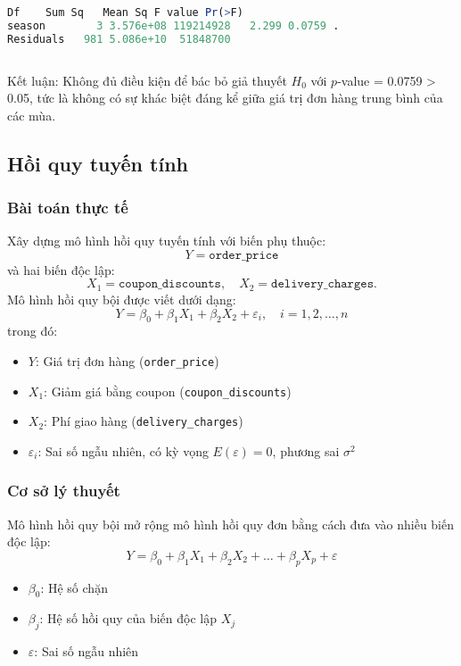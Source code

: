 \begin{lstlisting}[language=R, caption=Kết quả ANOVA một yếu tố]
Df    Sum Sq   Mean Sq F value Pr(>F)  
season        3 3.576e+08 119214928   2.299 0.0759 .
Residuals   981 5.086e+10  51848700 
  
\end{lstlisting}
Kết luận: Không đủ điều kiện để bác bỏ giả thuyết $H_0$ với $p$-value = 0.0759 > 0.05, tức là không có sự khác biệt đáng kể giữa giá trị đơn hàng trung bình của các mùa.
\pagebreak
\subsection{Hồi quy tuyến tính}

\subsubsection{Bài toán thực tế}
Xây dựng mô hình hồi quy tuyến tính với biến phụ thuộc:
\[
Y = \texttt{order\_price}
\]
và hai biến độc lập:
\[
X_1 = \texttt{coupon\_discounts}, \quad X_2 = \texttt{delivery\_charges}.
\]
Mô hình hồi quy bội được viết dưới dạng:
\[
Y = \beta_0 + \beta_1 X_1 + \beta_2 X_2 + \varepsilon_i, \quad i = 1, 2, \ldots, n
\]
trong đó:
\begin{itemize}
    \item $Y$: Giá trị đơn hàng (\texttt{order\_price})
    \item $X_1$: Giảm giá bằng coupon (\texttt{coupon\_discounts})
    \item $X_2$: Phí giao hàng (\texttt{delivery\_charges})
    \item $\varepsilon_i$: Sai số ngẫu nhiên, có kỳ vọng $E(\varepsilon) = 0$, phương sai $\sigma^2$
\end{itemize}

\subsubsection{Cơ sở lý thuyết}
Mô hình hồi quy bội mở rộng mô hình hồi quy đơn bằng cách đưa vào nhiều biến độc lập:
\[
Y = \beta_0 + \beta_1 X_1 + \beta_2 X_2 + \dots + \beta_p X_p + \varepsilon
\]
\begin{itemize}
    \item $\beta_0$: Hệ số chặn
    \item $\beta_j$: Hệ số hồi quy của biến độc lập $X_j$
    \item $\varepsilon$: Sai số ngẫu nhiên
\end{itemize}

